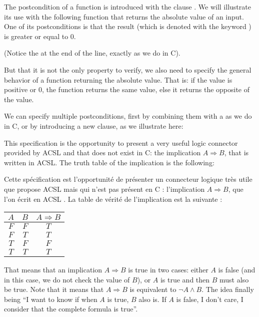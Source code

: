 The postcondition of a function is introduced with the clause . 
We will illustrate its use with the following function
that returns the absolute value of an input. One of its postconditions
is that the result (which is denoted with the keyword
) is greater or equal to 0.






(Notice the \CodeInline{;} at the end of the line, exactly as we do in C).

But that it is not the only property to verify, we also need to specify
the general behavior of a function returning the absolute value. That
is: if the value is positive or 0, the function returns the same value,
else it returns the opposite of the value.

We can specify multiple postconditions, first by combining them with a
\CodeInline{\&\&} as we do in C, or by introducing a new 
clause, as we illustrate here:







This specification is the opportunity to present a very useful logic
connector provided by ACSL and that does not exist in C: the implication
$A \Rightarrow B$, that is written  in
ACSL. The truth table of the implication is the following:

Cette spécification est l'opportunité de présenter un connecteur logique 
très utile que propose ACSL mais qui n'est pas présent en C : 
l'implication $A \Rightarrow B$, que l'on écrit en ACSL .
La table de vérité de l'implication est la suivante :



\begin{longtabu}{|c|c|c|} \hline
$A$ & $B$ & $A \Rightarrow B$ \\ \hline
$F$ & $F$ & $T$ \\ \hline
$F$ & $T$ & $T$ \\ \hline
$T$ & $F$ & $F$ \\ \hline
$T$ & $T$ & $T$ \\ \hline
\end{longtabu}



That means that an implication $A \Rightarrow B$ is true in two cases:
either $A$ is false (and in this case, we do not check the value of
$B$), or $A$ is true and then $B$ must also be true. Note that it means
that $A \Rightarrow B$ is equivalent to $\neg A \wedge B$. The idea
finally being ``I want to know if when $A$ is true, $B$ also is. If
$A$ is false, I don't care, I consider that the complete formula is
true''.



